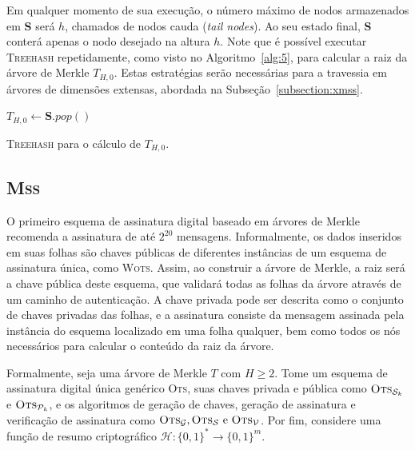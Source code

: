 \documentclass{ufsctex/ufsctex}
\newcommand{\hh}{\mathcal{H}}
\newcommand{\pk}{\mathcal{P}_k}
\newcommand{\sk}{\mathcal{S}_k}
\newcommand{\binwds}[1]{\{0, 1\}^{#1}}
\newcommand{\fhash}[1]{\hh{}: \binwds{*} \longrightarrow{} \binwds{#1}}
\newcommand{\wots}{\textsc{Wots}}
\newcommand{\mss}{\textsc{Mss}}
\begin{document}
Em qualquer momento de sua execução, o número máximo de nodos armazenados em
\textbf{S} será $h$, chamados de nodos cauda (\emph{tail nodes}). Ao seu estado
final, \textbf{S} conterá apenas o nodo desejado na altura $h$.  Note que é
possível executar \textsc{Treehash} repetidamente, como visto no
Algoritmo~\ref{alg:5}, para calcular a raiz da árvore de Merkle $T_{H, 0}$.
Estas estratégias serão necessárias para a travessia em árvores de dimensões
extensas, abordada na Subseção~\ref{subsection:xmss}.

\begin{algorithm}
  \vspace{2mm}

  $T_{H, 0} \longleftarrow \mathbf{S}.pop()$\;

  \vspace{2mm}
  \caption{\textsc{Treehash} para o cálculo de $T_{H, 0}$.}\label{alg:5}
\end{algorithm}

\subsection{\mss{}}\label{subsection:mss}

O primeiro esquema de assinatura digital baseado em árvores de
Merkle~\cite{Merkle:1989:CDS:118209.118230} recomenda a assinatura de até
$2^{20}$ mensagens. Informalmente, os dados inseridos em suas folhas são chaves
públicas de diferentes instâncias de um esquema de assinatura única, como
\wots{}. Assim, ao construir a árvore de Merkle, a raiz será a chave pública
deste esquema, que validará todas as folhas da árvore através de um caminho de
autenticação. A chave privada pode ser descrita como o conjunto de chaves
privadas das folhas, e a assinatura consiste da mensagem assinada pela
instância do esquema localizado em uma folha qualquer, bem como todos os nós
necessários para calcular o conteúdo da raiz da árvore.

Formalmente, seja uma árvore de Merkle $T$ com $H \geq 2$. Tome um esquema de
assinatura digital única genérico \textsc{Ots}, suas chaves privada e pública
como $\textsc{Ots}_{\sk{}}$ e $\textsc{Ots}_{\pk{}}$, e os algoritmos de
geração de chaves, geração de assinatura e verificação de assinatura como
$\textsc{Ots}_\mathcal{G}, \textsc{Ots}_\mathcal{S} \text{ e }
\textsc{Ots}_\mathcal{V}$. Por fim, considere uma função de resumo
criptográfico $\fhash{m}$.
\end{document}
